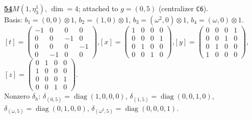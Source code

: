 \begin{samepage}\noindent\textbf{\underline{54}}\quad $M(1,\eta^{1}_{3})$, $\dim=4$; attached to $g=(0,5)$ (centralizer \texttt{C6}).\\
Basis: $b_{1}=(0,0)\otimes 1$, $b_{2}=(1,0)\otimes 1$, $b_{3}=(\omega^2,0)\otimes 1$, $b_{4}=(\omega,0)\otimes 1$.\\
$[t]=\left(\begin{smallmatrix} -1 & 0 & 0 & 0 \\ 0 & 0 & -1 & 0 \\ 0 & 0 & 0 & -1 \\ 0 & -1 & 0 & 0 \end{smallmatrix}\right)$,\quad $[x]=\left(\begin{smallmatrix} 1 & 0 & 0 & 0 \\ 0 & 0 & 0 & 1 \\ 0 & 1 & 0 & 0 \\ 0 & 0 & 1 & 0 \end{smallmatrix}\right)$,\quad $[y]=\left(\begin{smallmatrix} 0 & 0 & 0 & 1 \\ 0 & 0 & 1 & 0 \\ 0 & 1 & 0 & 0 \\ 1 & 0 & 0 & 0 \end{smallmatrix}\right)$,\quad $[z]=\left(\begin{smallmatrix} 0 & 1 & 0 & 0 \\ 1 & 0 & 0 & 0 \\ 0 & 0 & 0 & 1 \\ 0 & 0 & 1 & 0 \end{smallmatrix}\right)$.\\
Nonzero $\delta_h$: $\delta_{(0,5)}=\operatorname{diag}(1,0,0,0)$, $\delta_{(1,5)}=\operatorname{diag}(0,0,1,0)$, $\delta_{(\omega,5)}=\operatorname{diag}(0,1,0,0)$, $\delta_{(\omega^2,5)}=\operatorname{diag}(0,0,0,1)$.\end{samepage}
\medskip

